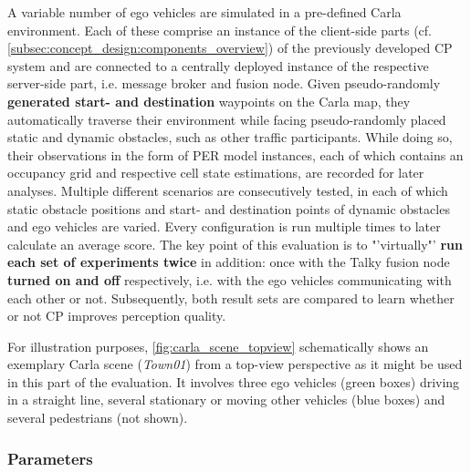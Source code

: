 A variable number of ego vehicles are simulated in a pre-defined Carla environment. Each of these comprise an instance of the client-side parts (cf. \cref{subsec:concept_design:components_overview}) of the previously developed CP system and are connected to a centrally deployed instance of the respective server-side part, i.e. message broker and fusion node. Given pseudo-randomly \textbf{generated start- and destination} waypoints on the Carla map, they automatically traverse their environment while facing pseudo-randomly placed static and dynamic obstacles, such as other traffic participants. While doing so, their observations in the form of PER model instances, each of which contains an occupancy grid and respective cell state estimations, are recorded for later analyses. Multiple different scenarios are consecutively tested, in each of which static obstacle positions and start- and destination points of dynamic obstacles and ego vehicles are varied. Every configuration is run multiple times to later calculate an average score. The key point of this evaluation is to "'virtually"' \textbf{run each set of experiments twice} in addition: once with the Talky fusion node \textbf{turned on and off} respectively, i.e. with the ego vehicles communicating with each other or not. Subsequently, both result sets are compared to learn whether or not CP improves perception quality.

For illustration purposes, \cref{fig:carla_scene_topview} schematically shows an exemplary Carla scene (\textit{Town01}) from a top-view perspective as it might be used in this part of the evaluation. It involves three ego vehicles (green boxes) driving in a straight line, several stationary or moving other vehicles (blue boxes) and several pedestrians (not shown).
\par
\bigskip

\subsubsection{Parameters}

